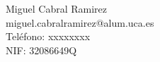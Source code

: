 Miguel Cabral Ramirez \\ %
miguel.cabralramirez@alum.uca.es \\ %
Teléfono: xxxxxxxx \\ %
NIF: 32086649Q \\ %
